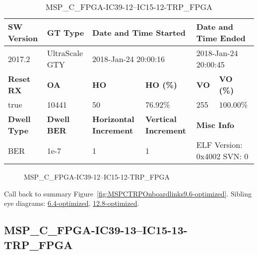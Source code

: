 \begin{table}[h]
\centering
\caption{MSP\_C\_FPGA-IC39-12--IC15-12-TRP\_FPGA}
\label{tab:MSPCFPGAIC3912IC1512TRPFPGA9.6-optimized}
\begin{tabular}{@{}|l|l|l|l|l|l|@{}}
\toprule
\textbf{SW Version}                & \textbf{GT Type}   & \multicolumn{2}{l|}{\textbf{Date and Time Started}}            & \multicolumn{2}{l|}{\textbf{Date and Time Ended}}        \\ \midrule
2017.2                       & UltraScale GTY          & \multicolumn{2}{l|}{2018-Jan-24 20:00:16}                   & \multicolumn{2}{l|}{2018-Jan-24 20:00:45}               \\ \midrule
\textbf{Reset RX}                  & \textbf{OA} & \textbf{HO}   & \textbf{HO (\%)} & \textbf{VO} & \textbf{VO (\%)} \\ \midrule
true & 10441        & 50          & 76.92\%        & 255        & 100.00\%       \\ \midrule
\textbf{Dwell Type}                & \textbf{Dwell BER} & \textbf{Horizontal Increment} & \textbf{Vertical Increment}    & \multicolumn{2}{l|}{\textbf{Misc Info}}                  \\ \midrule
BER                            & 1e-7        & 1        & 1           & \multicolumn{2}{l|}{ELF Version: 0x4002 SVN: 0}                         \\ \bottomrule
\end{tabular}
\end{table}

\begin{figure}[h]
\caption{MSP\_C\_FPGA-IC39-12--IC15-12-TRP\_FPGA} \label{fig:MSPCFPGAIC3912IC1512TRPFPGA9.6-optimized}
\end{figure}

Call back to summary Figure~\ref{fig:MSPCTRPOnboardlinks9.6-optimized}.
Sibling eye diagrams: \hyperref[sec:MSPCFPGAIC3912IC1512TRPFPGA6.4-optimized]{6.4-optimized}, \hyperref[sec:MSPCFPGAIC3912IC1512TRPFPGA12.8-optimized]{12.8-optimized}.

\clearpage
\newpage


\subsection{MSP\_C\_FPGA-IC39-13--IC15-13-TRP\_FPGA}\label{sec:MSPCFPGAIC3913IC1513TRPFPGA9.6-optimized}

